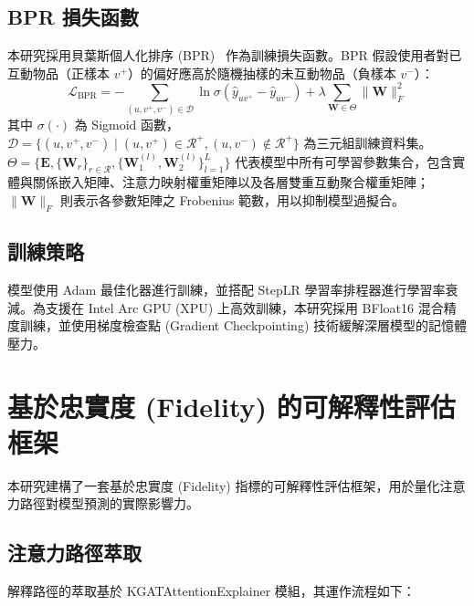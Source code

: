 \subsection*{BPR 損失函數}

本研究採用貝葉斯個人化排序 (BPR)~\cite{rendle2009bpr} 作為訓練損失函數。BPR 假設使用者對已互動物品（正樣本 $v^+$）的偏好應高於隨機抽樣的未互動物品（負樣本 $v^-$）：
\begin{equation}
  \mathcal{L}_\text{BPR} = - \sum_{(u, v^+, v^-) \in \mathcal{D}} \ln \sigma\left(\hat{y}_{uv^+} - \hat{y}_{uv^-}\right) + \lambda \sum_{\mathbf{W} \in \Theta} \|\mathbf{W}\|_F^2
  \label{eq:bpr_loss}
\end{equation}
其中 $\sigma(\cdot)$ 為 Sigmoid 函數，$\mathcal{D} = \{(u, v^+, v^-) \mid (u, v^+) \in \mathcal{R}^+, (u, v^-) \notin \mathcal{R}^+\}$ 為三元組訓練資料集。$\Theta = \{\mathbf{E}, \{\mathbf{W}_r\}_{r \in \mathcal{R}}, \{\mathbf{W}_1^{(l)}, \mathbf{W}_2^{(l)}\}_{l=1}^L\}$ 代表模型中所有可學習參數集合，包含實體與關係嵌入矩陣、注意力映射權重矩陣以及各層雙重互動聚合權重矩陣；$\|\mathbf{W}\|_F$ 則表示各參數矩陣之 Frobenius 範數，用以抑制模型過擬合。

\subsection*{訓練策略}

模型使用 Adam 最佳化器進行訓練，並搭配 StepLR 學習率排程器進行學習率衰減。為支援在 Intel Arc GPU (XPU) 上高效訓練，本研究採用 BFloat16 混合精度訓練，並使用梯度檢查點 (Gradient Checkpointing) 技術緩解深層模型的記憶體壓力。

\section{基於忠實度 (Fidelity) 的可解釋性評估框架}

本研究建構了一套基於忠實度 (Fidelity) 指標的可解釋性評估框架，用於量化注意力路徑對模型預測的實際影響力。

\subsection*{注意力路徑萃取}

解釋路徑的萃取基於 KGATAttentionExplainer 模組，其運作流程如下：

